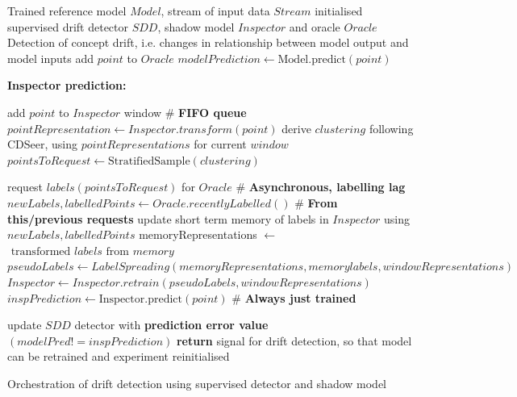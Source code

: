 \documentclass{svproc}
\begin{document}
\setlength{\textfloatsep}{5pt}
   \begin{algorithm}[H] 
	\begin{algorithmic}[1]
		\REQUIRE Trained reference model \( Model \), stream of input data \( Stream \) initialised supervised drift detector \( SDD \), shadow model \( Inspector \) and oracle \( Oracle \)
		\ENSURE Detection of concept drift, i.e. changes in relationship between model output and model inputs
		\STATE
		\STATE add \( point \) to  \( Oracle \)
		\STATE \( modelPrediction \leftarrow \text{Model.predict}(point) \) 
		
		\hrulefill
		
		\textbf{Inspector prediction:}
				
		\STATE add \( point \) to  \( Inspector \) window \hfill \# \textbf{FIFO queue}
		\STATE \( pointRepresentation \leftarrow Inspector.transform(point) \) 
		\STATE
		\STATE derive \( clustering \) following CDSeer, using \(pointRepresentations\) for current \(window \) 
		\STATE \( pointsToRequest \leftarrow \text{StratifiedSample}(clustering) \) 
		
		\STATE request \(  labels(pointsToRequest) \) for \( Oracle \) \hfill \# \textbf{Asynchronous, labelling lag}				
		\STATE \( newLabels,labelledPoints \leftarrow Oracle.recentlyLabelled() \) \hfill \# \textbf{From this/previous requests}
		\STATE update short term memory of labels in \( Inspector \) using \( newLabels,labelledPoints \)
		\STATE		
		\STATE memoryRepresentations $\leftarrow$ \(\text{ transformed } labels \text{ from } memory\)
		\STATE \(pseudoLabels \leftarrow LabelSpreading(memoryRepresentations,memorylabels,windowRepresentations)\)
		\STATE \(Inspector \leftarrow Inspector.retrain(pseudoLabels,windowRepresentations) \) 
		\STATE
		\STATE \( inspPrediction \leftarrow \text{Inspector.predict}(point) \) \hfill \# \textbf{Always just trained} 
		
		\hrulefill
		\STATE update \(SDD\) detector with \textbf{prediction error value }\( (modelPred != inspPrediction) \)
		\STATE
		\ENDWHILE
		\STATE
		\STATE \textbf{return} signal for drift detection, so that model can be retrained and experiment reinitialised
	\end{algorithmic}
	\caption{Orchestration of drift detection using supervised detector and shadow model}
	\label{algo1}
\end{algorithm}
\end{document}
